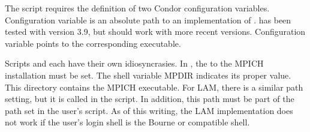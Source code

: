 The  script requires the definition of
two Condor configuration variables.
Configuration variable  is an absolute path to
an implementation of .
 has been tested with  version 3.9,
but should work with more recent versions.
Configuration variable  points
to the corresponding  executable.

Scripts  and 
each have their own idiosyncrasies.
In , the  to the MPICH installation must be set.
The shell variable MPDIR indicates its proper value.
This directory contains the MPICH  executable.
For LAM, there is a similar path setting, but it is called 
in the  script.  In addition, this path must be part of the
path set in the user's  script.
As of this writing, the LAM implementation does not work
if the user's login shell is the Bourne or compatible shell.





